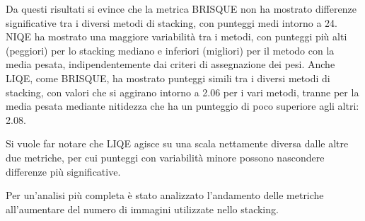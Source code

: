 Da questi risultati si evince che la metrica BRISQUE non ha mostrato differenze significative tra i diversi metodi di stacking, con punteggi medi intorno a 24. NIQE ha mostrato una maggiore variabilità tra i metodi, con punteggi più alti (peggiori) per lo stacking mediano e inferiori (migliori) per il metodo con la media pesata, indipendentemente dai criteri di assegnazione dei pesi. Anche LIQE, come BRISQUE, ha mostrato punteggi simili tra i diversi metodi di stacking, con valori che si aggirano intorno a 2.06 per i vari metodi, tranne per la media pesata mediante nitidezza che ha un punteggio di poco superiore agli altri: 2.08.

Si vuole far notare che LIQE agisce su una scala nettamente diversa dalle altre due metriche, per cui punteggi con variabilità minore possono nascondere differenze più significative.

Per un'analisi più completa è stato analizzato l'andamento delle metriche all'aumentare del numero di immagini utilizzate nello stacking.


